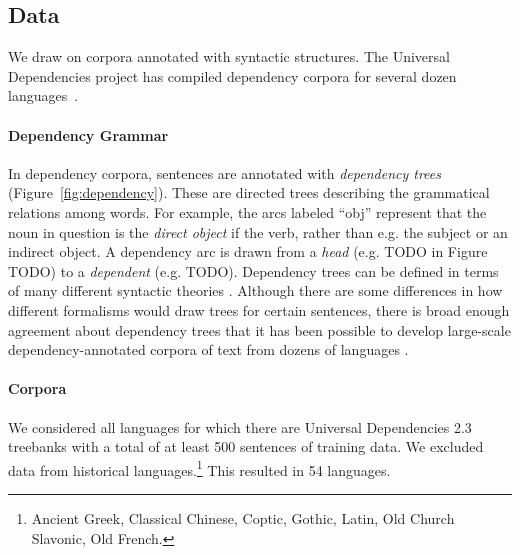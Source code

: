 \documentclass[11pt,letterpaper]{article}
\begin{document}
\subsection{Data}
We draw on corpora annotated with syntactic structures.
The Universal Dependencies project has compiled dependency corpora for several dozen languages~\citep{nivre-universal-2017}.

\paragraph{Dependency Grammar}
In dependency corpora, sentences are annotated with \emph{dependency trees} (Figure~\ref{fig:dependency}).
These are directed trees describing the grammatical relations among words. For example, the arcs labeled ``obj'' represent that the noun in question is the \emph{direct object} if the verb, rather than e.g. the subject or an indirect object.
A dependency arc is drawn from a \emph{head} (e.g. TODO in Figure TODO) to a \emph{dependent} (e.g. TODO).
Dependency trees can be defined in terms of many different syntactic theories \cite{corbett1993heads}.
Although there are some differences in how different formalisms would draw trees for certain sentences, there is broad enough agreement about dependency trees that it has been possible to develop large-scale dependency-annotated corpora of text from dozens of languages \cite{nivre2017universal}.

\paragraph{Corpora}
We considered all languages for which there are Universal Dependencies 2.3 treebanks with a total of at least 500 sentences of training data.
We excluded data from historical languages.\footnote{Ancient Greek, Classical Chinese, Coptic, Gothic, Latin, Old Church Slavonic, Old French.}
This resulted in 54 languages.
\end{document}

